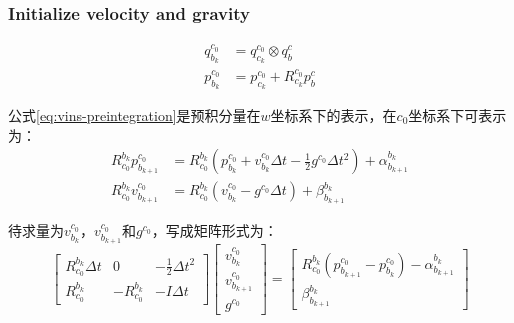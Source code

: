 \subsubsection{Initialize velocity and gravity}
\begin{equation} \label{eq:vins-transform}
	\begin{split}
		q_{b_k}^{c_0} &= q_{c_k}^{c_0} \otimes q_b^c \\
		p_{b_k}^{c_0} &= p_{c_k}^{c_0} + R_{c_k}^{c_0} p_b^c
	\end{split}
\end{equation}
\par 公式\ref{eq:vins-preintegration}是预积分量在$w$坐标系下的表示，在$c_0$坐标系下可表示为：
\begin{equation}
	\begin{split}
		R_{c_0}^{b_k}p_{b_{k+1}}^{c_0} &= R_{c_0}^{b_k}( p_{b_k}^{c_0} + v_{b_k}^{c_0}\Delta{t} - \frac12g^{c_0}\Delta{t}^2) + \alpha_{b_{k+1}}^{b_k} \\
		R_{c_0}^{b_k}v_{b_{k+1}}^{c_0} &= R_{c_0}^{b_k}( v_{b_k}^{c_0} - g^{c_0}\Delta{t} ) + \beta_{b_{k+1}}^{b_k}
	\end{split}
\end{equation}
\par 待求量为$v_{b_k}^{c_0}$，$v_{b_{k+1}}^{c_0}$和$g^{c_0}$，写成矩阵形式为：
\begin{equation}
	\begin{bmatrix}
		R_{c_0}^{b_k}\Delta{t} & 0              & -\frac12\Delta{t}^2 \\
		R_{c_0}^{b_k}          & -R_{c_0}^{b_k} & -I\Delta{t}
	\end{bmatrix}
	\begin{bmatrix}
		v_{b_k}^{c_0} \\ v_{b_{k+1}}^{c_0} \\ g^{c_0}
	\end{bmatrix}
	=
	\begin{bmatrix}
		R_{c_0}^{b_k} (p_{b_{k+1}}^{c_0}-p_{b_k}^{c_0}) - \alpha_{b_{k+1}}^{b_k} \\
		\beta_{b_{k+1}}^{b_k}
	\end{bmatrix}
\end{equation}